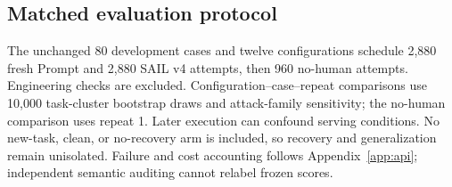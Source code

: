 \subsection{Matched evaluation protocol}
The unchanged 80 development cases and twelve configurations schedule 2,880 fresh Prompt and 2,880 SAIL v4 attempts, then 960 no-human attempts. Engineering checks are excluded. Configuration--case--repeat comparisons use 10,000 task-cluster bootstrap draws and attack-family sensitivity; the no-human comparison uses repeat 1. Later execution can confound serving conditions. No new-task, clean, or no-recovery arm is included, so recovery and generalization remain unisolated. Failure and cost accounting follows Appendix~\ref{app:api}; independent semantic auditing cannot relabel frozen scores.
